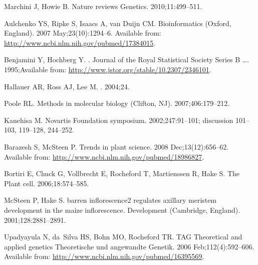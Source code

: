 \documentclass[10pt,letterpaper]{article}
\begin{document}
\begin{thebibliography}{10}
Marchini J, Howie B.
\newblock Nature reviews Genetics. 2010;11:499--511.

Aulchenko YS, Ripke S, Isaacs A, van Duijn CM.
\newblock Bioinformatics (Oxford, England). 2007 May;23(10):1294--6.
\newblock Available from: \url{http://www.ncbi.nlm.nih.gov/pubmed/17384015}.

Benjamini Y, Hochberg Y.
.
\newblock Journal of the Royal Statistical Society Series B \ldots.
  1995;Available from: \url{http://www.jstor.org/stable/10.2307/2346101}.

Hallauer AR, Ross AJ, Lee M.
. 2004;24.

Poole RL.
\newblock Methods in molecular biology (Clifton, NJ). 2007;406:179--212.

Kanehisa M.
\newblock Novartis Foundation symposium. 2002;247:91--101; discussion 101--103,
  119--128, 244--252.

Barazesh S, McSteen P.
\newblock Trends in plant science. 2008 Dec;13(12):656--62.
\newblock Available from: \url{http://www.ncbi.nlm.nih.gov/pubmed/18986827}.

Bortiri E, Chuck G, Vollbrecht E, Rocheford T, Martienssen R, Hake S.
\newblock The Plant cell. 2006;18:574--585.

McSteen P, Hake S.
\newblock barren inflorescence2 regulates axillary meristem development in the
  maize inflorescence.
\newblock Development (Cambridge, England). 2001;128:2881--2891.

Upadyayula N, da~Silva HS, Bohn MO, Rocheford TR.
\newblock TAG Theoretical and applied genetics Theoretische und angewandte
  Genetik. 2006 Feb;112(4):592--606.
\newblock Available from: \url{http://www.ncbi.nlm.nih.gov/pubmed/16395569}.


\end{thebibliography}
\end{document}
